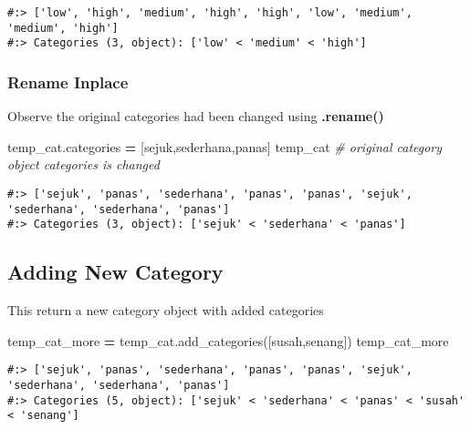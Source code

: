 \documentclass[
]{book}
\newenvironment{Shaded}{\begin{snugshade}}{\end{snugshade}}
\newcommand{\CommentTok}[1]{\textcolor[rgb]{0.37,0.37,0.37}{\textit{#1}}}
\newcommand{\NormalTok}[1]{#1}
\newcommand{\OperatorTok}[1]{\textcolor[rgb]{0.43,0.43,0.43}{\textbf{#1}}}
\newcommand{\StringTok}[1]{\textcolor[rgb]{0.5,0.5,0.5}{#1}}
\begin{document}
\begin{verbatim}
#:> ['low', 'high', 'medium', 'high', 'high', 'low', 'medium', 'medium', 'high']
#:> Categories (3, object): ['low' < 'medium' < 'high']
\end{verbatim}

\hypertarget{rename-inplace}{%
\subsubsection{Rename Inplace}\label{rename-inplace}}

Observe the original categories had been changed using \textbf{.rename()}

\begin{Shaded}
\begin{Highlighting}[]
\NormalTok{temp\_cat.categories }\OperatorTok{=}\NormalTok{ [}\StringTok{\textquotesingle{}sejuk\textquotesingle{}}\NormalTok{,}\StringTok{\textquotesingle{}sederhana\textquotesingle{}}\NormalTok{,}\StringTok{\textquotesingle{}panas\textquotesingle{}}\NormalTok{]}
\NormalTok{temp\_cat   }\CommentTok{\# original category object categories is changed}
\end{Highlighting}
\end{Shaded}

\begin{verbatim}
#:> ['sejuk', 'panas', 'sederhana', 'panas', 'panas', 'sejuk', 'sederhana', 'sederhana', 'panas']
#:> Categories (3, object): ['sejuk' < 'sederhana' < 'panas']
\end{verbatim}

\hypertarget{adding-new-category}{%
\subsection{Adding New Category}\label{adding-new-category}}

This return a new category object with added categories

\begin{Shaded}
\begin{Highlighting}[]
\NormalTok{temp\_cat\_more }\OperatorTok{=}\NormalTok{ temp\_cat.add\_categories([}\StringTok{\textquotesingle{}susah\textquotesingle{}}\NormalTok{,}\StringTok{\textquotesingle{}senang\textquotesingle{}}\NormalTok{])}
\NormalTok{temp\_cat\_more}
\end{Highlighting}
\end{Shaded}

\begin{verbatim}
#:> ['sejuk', 'panas', 'sederhana', 'panas', 'panas', 'sejuk', 'sederhana', 'sederhana', 'panas']
#:> Categories (5, object): ['sejuk' < 'sederhana' < 'panas' < 'susah' < 'senang']
\end{verbatim}
\end{document}
